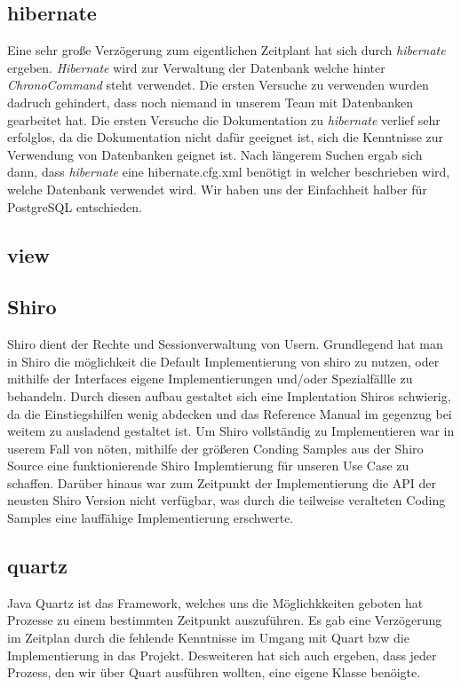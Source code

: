 \subsection{hibernate}
Eine sehr große Verzögerung zum eigentlichen Zeitplant hat sich durch \emph{hibernate} ergeben. \emph{Hibernate} wird zur Verwaltung der
Datenbank welche hinter \emph{ChronoCommand} steht verwendet. Die ersten Versuche  zu verwenden wurden dadruch
gehindert, dass noch niemand in unserem Team mit Datenbanken gearbeitet hat. Die ersten Versuche die Dokumentation zu 
\emph{hibernate} verlief sehr erfolglos, da die Dokumentation nicht dafür geeignet ist, sich die Kenntnisse zur Verwendung von
Datenbanken geignet ist. Nach längerem Suchen ergab sich dann, dass \emph{hibernate} eine hibernate.cfg.xml benötigt in welcher 
beschrieben wird, welche Datenbank verwendet wird. Wir haben uns der Einfachheit halber für PostgreSQL entschieden. 


\subsection{view} %
\subsection{Shiro}
Shiro dient der Rechte und Sessionverwaltung von Usern.
Grundlegend hat man in Shiro die möglichkeit die Default Implementierung von shiro zu nutzen, oder mithilfe der Interfaces
eigene Implementierungen und/oder Spezialfällle zu behandeln.
Durch diesen aufbau gestaltet sich eine Implentation Shiros schwierig, da die Einstiegshilfen wenig abdecken und das Reference Manual
im gegenzug bei weitem zu ausladend gestaltet ist. Um Shiro vollständig zu Implementieren war in userem Fall von nöten, mithilfe der
größeren Conding Samples aus der Shiro Source eine funktionierende Shiro Implemtierung für unseren Use Case zu schaffen.
Darüber hinaus war zum Zeitpunkt der Implementierung die API der neusten Shiro Version nicht verfügbar, was durch die teilweise veralteten Coding Samples
 eine lauffähige Implementierung erschwerte.
\subsection{quartz} %
Java Quartz ist das Framework, welches uns die Möglichkkeiten geboten hat Prozesse zu einem bestimmten Zeitpunkt auszuführen. Es gab eine Verzögerung im Zeitplan durch die fehlende Kenntnisse im Umgang mit Quart bzw die Implementierung in das Projekt.
Desweiteren hat sich auch ergeben, dass jeder Prozess, den wir über Quart ausführen wollten, eine eigene Klasse benöigte.

